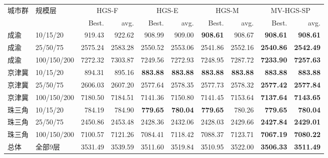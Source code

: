 \begin{tabular}{@{}llrrrrrrrr@{}}
\toprule
城市群 & 规模层 & \multicolumn{2}{c}{HGS-F} & \multicolumn{2}{c}{HGS-E} & \multicolumn{2}{c}{HGS-M} & \multicolumn{2}{c}{MV-HGS-SP}\\
 &  & Best. & avg. & Best. & avg. & Best. & avg. & Best. & avg.\\
\midrule
成渝 & 10/15/20 & 919.43 & 922.62 & 908.99 & 909.00 & \textbf{908.61} & 908.67 & \textbf{908.61} & \textbf{908.61} \\
成渝 & 25/50/75 & 2575.24 & 2583.28 & 2550.52 & 2553.06 & 2541.86 & 2552.16 & \textbf{2540.86} & \textbf{2542.49} \\
成渝 & 100/150/200 & 7272.32 & 7303.87 & 7249.56 & 7272.93 & 7248.95 & 7287.72 & \textbf{7233.90} & \textbf{7257.63} \\
京津冀 & 10/15/20 & 894.31 & 895.16 & \textbf{883.88} & \textbf{883.88} & \textbf{883.88} & \textbf{883.88} & \textbf{883.88} & \textbf{883.88} \\
京津冀 & 25/50/75 & 2606.03 & 2607.20 & 2577.64 & 2578.35 & 2577.73 & 2578.32 & \textbf{2577.42} & \textbf{2577.84} \\
京津冀 & 100/150/200 & 7180.50 & 7184.51 & 7141.36 & 7150.80 & 7141.45 & 7153.64 & \textbf{7137.64} & \textbf{7143.65} \\
珠三角 & 10/15/20 & 784.19 & 784.90 & \textbf{779.65} & \textbf{780.04} & \textbf{779.65} & 780.26 & \textbf{779.65} & \textbf{780.04} \\
珠三角 & 25/50/75 & 2450.86 & 2453.48 & 2428.36 & 2432.06 & 2428.03 & 2429.66 & \textbf{2427.84} & \textbf{2429.01} \\
珠三角 & 100/150/200 & 7100.57 & 7121.26 & 7084.41 & 7118.42 & 7088.37 & 7123.71 & \textbf{7067.19} & \textbf{7080.22} \\
总体 & 全部9层 & 3531.49 & 3539.59 & 3511.60 & 3519.84 & 3510.95 & 3522.00 & \textbf{3506.33} & \textbf{3511.49} \\
\bottomrule
\end{tabular}
